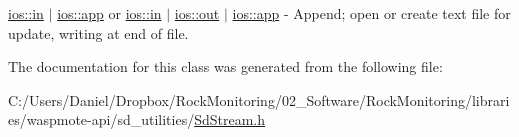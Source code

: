 \hyperlink{classios__base_ae5432e3c269064480652c4602f5f74ad}{ios\+::in} $\vert$ \hyperlink{classios__base_a8380aac3c405730708888fdc68905820}{ios\+::app} or \hyperlink{classios__base_ae5432e3c269064480652c4602f5f74ad}{ios\+::in} $\vert$ \hyperlink{classios__base_a4c1d517774c0d11af3424e90395f26ae}{ios\+::out} $\vert$ \hyperlink{classios__base_a8380aac3c405730708888fdc68905820}{ios\+::app} -\/ Append; open or create text file for update, writing at end of file. 

The documentation for this class was generated from the following file\+:\begin{DoxyCompactItemize}
\item 
C\+:/\+Users/\+Daniel/\+Dropbox/\+Rock\+Monitoring/02\+\_\+\+Software/\+Rock\+Monitoring/libraries/waspmote-\/api/sd\+\_\+utilities/\hyperlink{_sd_stream_8h}{Sd\+Stream.\+h}\end{DoxyCompactItemize}
